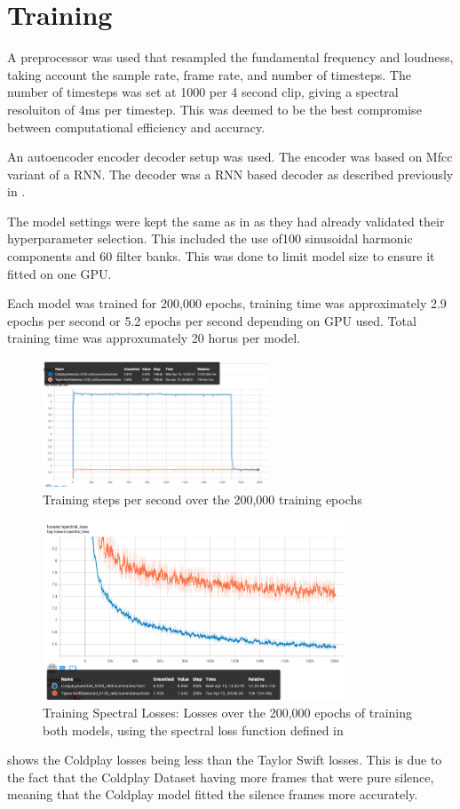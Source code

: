 \section{Training}

A preprocessor was used that resampled the fundamental frequency and loudness, taking account the sample rate, frame rate, and number of timesteps. The number of timesteps was set at 1000 per 4 second clip, giving a spectral resoluiton of 4ms per timestep. This was deemed to be the best compromise between computational efficiency and accuracy.

An autoencoder encoder decoder setup was used. The encoder was based on Mfcc variant of a \acrfull{RNN}. The decoder was a RNN based decoder as described previously in .

The model settings were kept the same as in  as they had already validated their hyperparameter selection. This included the use of100 sinusoidal harmonic components and 60 filter banks. This was done to limit model size to ensure it fitted on one GPU.

Each model was trained for 200,000 epochs, training time was approximately 2.9 epochs per second or 5.2 epochs per second depending on GPU used. Total training time was approxumately 20 horus per model.

\begin{figure}[!ht]
    \centering
    \includegraphics[width=0.6\textwidth]{research/training/StepsPerSecond.png}
    \caption{Training steps per second over the 200,000 training epochs}
\end{figure}

\begin{figure}[!ht]
    \centering
    \includegraphics[width=0.8\textwidth]{research/training/TrainingSpectralLosses.png}
    \caption{Training Spectral Losses: Losses over the 200,000 epochs of training both models, using the spectral loss function defined in }
    \label{fig:training_spectral_losses}
\end{figure}

 shows the Coldplay losses being less than the Taylor Swift losses. This is due to the fact that the Coldplay Dataset having more frames that were pure silence, meaning that the Coldplay model fitted the silence frames more accurately.

